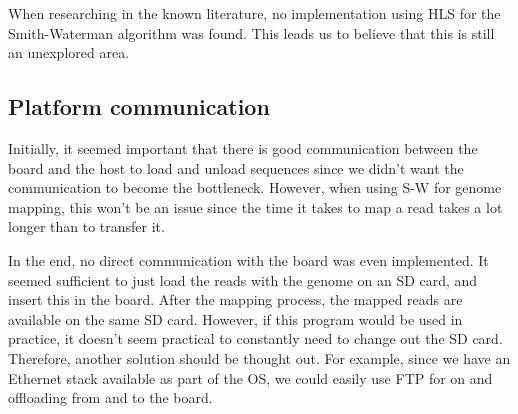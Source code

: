 When researching in the known literature, no implementation using HLS for the Smith-Waterman algorithm was found. This leads us to believe that this is still an unexplored area.

\subsection{Platform communication}

Initially, it seemed important that there is good communication between the board and the host to load and unload sequences since we didn't want the communication to become the bottleneck. However, when using S-W for genome mapping, this won't be an issue since the time it takes to map a read takes a lot longer than to transfer it.

In the end, no direct communication with the board was even implemented. It seemed sufficient to just load the reads with the genome on an SD card, and insert this in the board. After the mapping process, the mapped reads are available on the same SD card. However, if this program would be used in practice, it doesn't seem practical to constantly need to change out the SD card. Therefore, another solution should be thought out. For example, since we have an Ethernet stack available as part of the OS, we could easily use FTP for on and offloading from and to the board.

